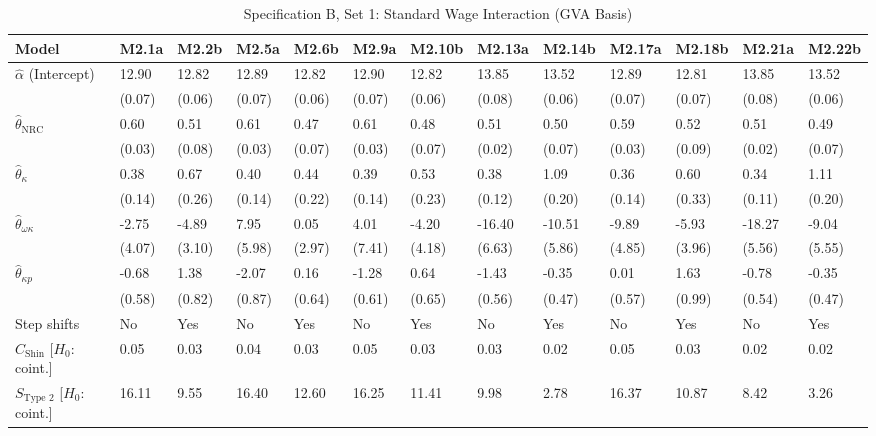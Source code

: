\FloatBarrier
\begin{table}[h!]
	\centering
	\caption{Specification B, Set 1: Standard Wage Interaction (GVA Basis)}
	\label{tab:specB_set1_gva_app}
	\tiny
	\setlength{\tabcolsep}{1.5pt}
	\begin{tabular}{p{3.2cm}p{1.0cm}p{1.0cm}p{1.0cm}p{1.0cm}p{1.0cm}p{1.0cm}p{1.0cm}p{1.0cm}p{1.0cm}p{1.0cm}p{1.0cm}p{1.0cm}}
		\toprule
		Model & M2.1a & M2.2b & M2.5a & M2.6b & M2.9a & M2.10b & M2.13a & M2.14b & M2.17a & M2.18b & M2.21a & M2.22b \\
		\midrule
		$\hat{\alpha}$ (Intercept) & 12.90 & 12.82 & 12.89 & 12.82 & 12.90 & 12.82 & 13.85 & 13.52 & 12.89 & 12.81 & 13.85 & 13.52 \\
		& (0.07) & (0.06) & (0.07) & (0.06) & (0.07) & (0.06) & (0.08) & (0.06) & (0.07) & (0.07) & (0.08) & (0.06) \\
		$\hat{\theta}_{\text{NRC}}$ & 0.60 & 0.51 & 0.61 & 0.47 & 0.61 & 0.48 & 0.51 & 0.50 & 0.59 & 0.52 & 0.51 & 0.49 \\
		& (0.03) & (0.08) & (0.03) & (0.07) & (0.03) & (0.07) & (0.02) & (0.07) & (0.03) & (0.09) & (0.02) & (0.07) \\
		$\hat{\theta}_{\kappa}$ & 0.38 & 0.67 & 0.40 & 0.44 & 0.39 & 0.53 & 0.38 & 1.09 & 0.36 & 0.60 & 0.34 & 1.11 \\
		& (0.14) & (0.26) & (0.14) & (0.22) & (0.14) & (0.23) & (0.12) & (0.20) & (0.14) & (0.33) & (0.11) & (0.20) \\
		$\hat{\theta}_{\omega\kappa}$ & -2.75 & -4.89 & 7.95 & 0.05 & 4.01 & -4.20 & -16.40 & -10.51 & -9.89 & -5.93 & -18.27 & -9.04 \\
		& (4.07) & (3.10) & (5.98) & (2.97) & (7.41) & (4.18) & (6.63) & (5.86) & (4.85) & (3.96) & (5.56) & (5.55) \\
		$\hat{\theta}_{\kappa p}$ & -0.68 & 1.38 & -2.07 & 0.16 & -1.28 & 0.64 & -1.43 & -0.35 & 0.01 & 1.63 & -0.78 & -0.35 \\
		& (0.58) & (0.82) & (0.87) & (0.64) & (0.61) & (0.65) & (0.56) & (0.47) & (0.57) & (0.99) & (0.54) & (0.47) \\
		\midrule
		Step shifts & No & Yes & No & Yes & No & Yes & No & Yes & No & Yes & No & Yes \\
		$C_{\text{Shin}}$ [$H_0$: coint.] & 0.05 & 0.03 & 0.04 & 0.03 & 0.05 & 0.03 & 0.03 & 0.02 & 0.05 & 0.03 & 0.02 & 0.02 \\
		$S_{\text{Type 2}}$ [$H_0$: coint.] & 16.11 & 9.55 & 16.40 & 12.60 & 16.25 & 11.41 & 9.98 & 2.78 & 16.37 & 10.87 & 8.42 & 3.26 \\

\end{tabular}
\end{table}
